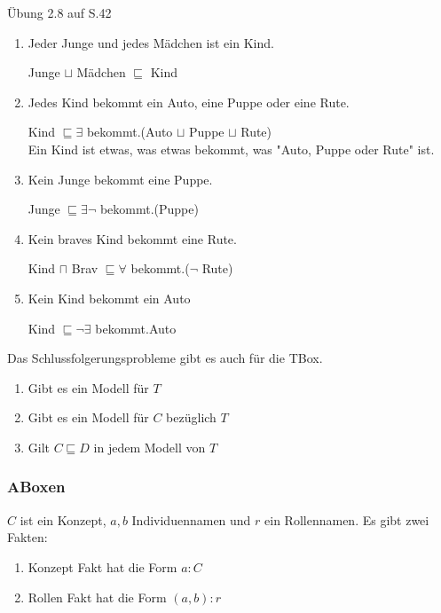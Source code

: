 \documentclass[a4paper]{article}
\begin{document}
Übung 2.8 auf S.42


\begin{enumerate}
    \item Jeder Junge und jedes Mädchen ist ein Kind. 
    
    Junge $\sqcup$ Mädchen $\sqsubseteq$ Kind
    \item Jedes Kind bekommt ein Auto, eine Puppe oder eine Rute. 
    
    Kind $\sqsubseteq \exists$ bekommt.(Auto $\sqcup$ Puppe $\sqcup$ Rute) \\
    Ein Kind ist etwas, was etwas bekommt, was "Auto, Puppe oder Rute" ist.
    \item Kein Junge bekommt eine Puppe. 
    
    Junge $\sqsubseteq \exists \neg$ bekommt.(Puppe)
    \item Kein braves Kind bekommt eine Rute. 
    
    Kind $\sqcap$ Brav $\sqsubseteq \forall$ bekommt.($\neg$ Rute)
    \item Kein Kind bekommt ein Auto
    
    Kind $\sqsubseteq \neg \exists$ bekommt.Auto
\end{enumerate}

Das Schlussfolgerungsprobleme gibt es auch für die TBox.

\begin{enumerate}
    \item Gibt es ein Modell für $T$
    \item Gibt es ein Modell für $C$ bezüglich $T$
    \item Gilt $C \sqsubseteq D$ in jedem Modell von $T$
\end{enumerate}

\subsubsection{ABoxen}

$C$ ist ein Konzept, $a, b$ Individuennamen und $r$ ein Rollennamen. Es gibt zwei Fakten:

\begin{enumerate}
    \item Konzept Fakt hat die Form $a:C$
    \item Rollen Fakt hat die Form $(a,b):r$
\end{enumerate}
\end{document}

